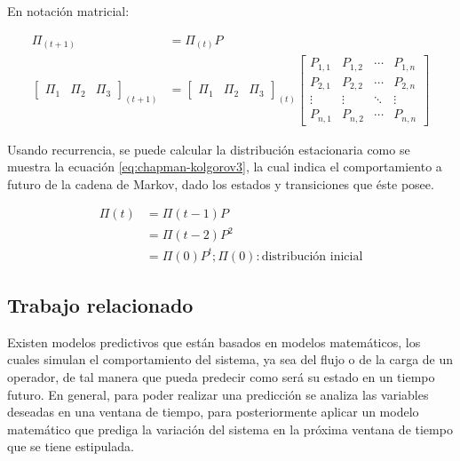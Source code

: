 En notación matricial:

\begin{equation} \label{eq:chapman-kolgorov2}
\begin{split}
	\Pi_{(t+1)} &= \Pi_{(t)}P\\
	\begin{bmatrix}
		\Pi_1 & \Pi_2 & \Pi_3
	\end{bmatrix} _{(t+1)}
	&= \begin{bmatrix}
		\Pi_1 & \Pi_2 & \Pi_3
	\end{bmatrix} _{(t)}
	\begin{bmatrix}
		P_{1,1} & P_{1,2} & \cdots & P_{1,n} \\
		P_{2,1} & P_{2,2} & \cdots & P_{2,n} \\
		\vdots  & \vdots  & \ddots & \vdots  \\
		P_{n,1} & P_{n,2} & \cdots & P_{n,n}
	\end{bmatrix}
\end{split}
\end{equation}

Usando recurrencia, se puede calcular la distribución estacionaria como se muestra la ecuación \ref{eq:chapman-kolgorov3}, la cual indica el comportamiento a futuro de la cadena de Markov, dado los estados y transiciones que éste posee.

\begin{equation} \label{eq:chapman-kolgorov3}
\begin{split}
	\Pi (t) &= \Pi (t-1)P \\
				  &= \Pi (t-2)P^{2}\\
				  &= \Pi (0)P^{t} ; \Pi (0): \text{distribución inicial}
\end{split}
\end{equation}

\subsection{Trabajo relacionado}
\label{subSec:markovTrabajo}
Existen modelos predictivos que están basados en modelos matemáticos, los cuales simulan el comportamiento del sistema, ya sea del flujo o de la carga de un operador, de tal manera que pueda predecir como será su estado en un tiempo futuro. En general, para poder realizar una predicción se analiza las variables deseadas en una ventana de tiempo, para posteriormente aplicar un modelo matemático que prediga la variación del sistema en la próxima ventana de tiempo que se tiene estipulada.

